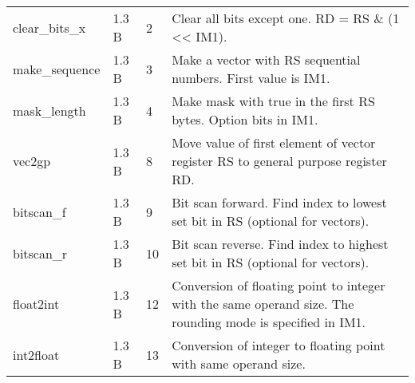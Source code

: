 \documentclass[forwardcom.tex]{subfiles}
\begin{document}
\begin{longtable} {|p{20mm}|p{10mm}|p{8mm}|p{75mm}|}
clear\_bits\_x & 1.3 B &  2 & Clear all bits except one. RD = RS \& (1 \textless\textless{} IM1). \\
make\_sequence& 1.3 B &  3 & Make a vector with RS sequential numbers. First value is IM1. \\
mask\_length  & 1.3 B &  4 & Make mask with true in the first RS bytes. Option bits in IM1. \\
vec2gp        & 1.3 B &  8 & Move value of first element of vector register RS to general purpose register RD. \\
bitscan\_f    & 1.3 B &  9 & Bit scan forward. Find index to lowest set bit in RS (optional for vectors). \\
bitscan\_r    & 1.3 B & 10 & Bit scan reverse. Find index to highest set bit in RS (optional for vectors). \\

float2int     & 1.3 B & 12 & Conversion of floating point to integer with the same operand size. The rounding mode is specified in IM1. \\
int2float     & 1.3 B & 13 & Conversion of integer to floating point with same operand size. \\


\end{longtable}
\end{document}
